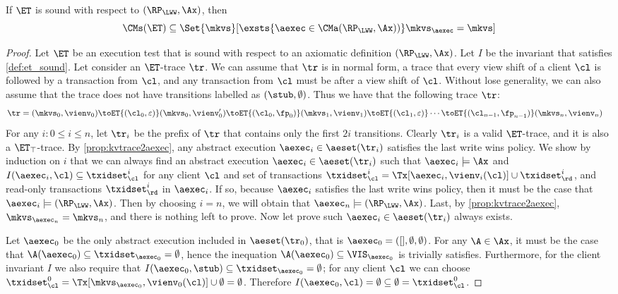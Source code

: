 \begin{theorem}[Soundness]
\label{thm:et_soundness}
If $\ET$ is sound with respect to $(\RP_{\LWW}, \Ax)$, then 
\[
    \CMs(\ET) \subseteq \Set{ \mkvs }[ \exsts{ \aexec \in \CMa(\RP_{\LWW}, \Ax)) }\mkvs_{\aexec} = \mkvs]
\]
\end{theorem}
\begin{proof}
Let $\ET$ be an execution test that is sound with respect to an 
axiomatic definition $(\RP_{\LWW}, \Ax)$. Let $I$ be 
the invariant that satisfies \cref{def:et_sound}. 
Let consider an $\ET$-trace $\tr$.
We can assume that $\tr$ is in normal form, 
a trace that every view shift of a client \( \cl \) is followed by a transaction from \( \cl \),
and any transaction from \( \cl \) must be after a view shift of \( \cl \).
Without lose generality, we can also assume that the trace does not have transitions labelled as $(\stub, \emptyset)$.
Thus we have that the following trace \( \tr \):
\begin{align*}
\tr & =  (\mkvs_{0}, \vienv_{0}) \toET{(\cl_{0}, \varepsilon)} (\mkvs_{0}, \vienv_{0}') 
\toET{(\cl_{0}, \fp_{0})} 
(\mkvs_1, \vienv_{1}) \toET{(\cl_1, \varepsilon)}  \cdots
\toET{(\cl_{n-1}, \fp_{n-1})} (\mkvs_{n}, \vienv_{n})
\end{align*}
For any $i : 0 \leq i \leq n$, let $\tr_{i}$ be the prefix of $\tr$ that 
contains only the first $2i$ transitions. 
Clearly $\tr_{i}$ is a valid $\ET$-trace, and it is also a $\ET_{\top}$-trace. 
By \cref{prop:kvtrace2aexec}, 
any abstract execution $\aexec_{i} \in \aeset(\tr_{i})$ satisfies the last write wins policy. 
We show by induction on $i$ that we can always find 
an abstract execution $\aexec_{i} \in \aeset(\tr_{i})$ such that $\aexec_i \models \Ax$ and $I(\aexec_{i}, \cl) \subseteq \txidset^{i}_{\cl}$
for any client $\cl$ and set of transactions 
$\txidset^{i}_{\cl} = \Tx[\aexec_{i}, \vienv_{i}(\cl)] \cup \txidset^{i}_\rd$, 
and read-only transactions $\txidset_\rd^{i}$ in $\aexec_{i}$.
If so, because $\aexec_{i}$ satisfies the last write wins policy,
then it must be the case that $\aexec_{i} \models (\RP_{\LWW}, \Ax)$. 
Then by choosing $i = n$, we will obtain that $\aexec_{n} \models (\RP_{\LWW}, \Ax)$. 
Last, by \cref{prop:kvtrace2aexec}, $\mkvs_{\aexec_{n}} = \mkvs_{n}$, and there is nothing left to prove.
Now let prove such $\aexec_{i} \in \aeset(\tr_{i})$ always exists.

Let $\aexec_{0}$ be the only abstract execution included in $\aeset(\tr_{0})$, 
that is $\aexec_{0} = ([], \emptyset, \emptyset)$. 
For any $\A \in \Ax$, it must be the case that 
$\A(\aexec_{0}) \subseteq \txidset_{\aexec_{0}} = \emptyset$, 
hence the inequation $\A(\aexec_{0}) \subseteq \VIS_{\aexec_{0}}$ is trivially satisfies.
Furthermore, for the client invariant $I$ we also require that $I(\aexec_{0}, \stub) \subseteq \txidset_{\aexec_{0}} = \emptyset$; 
for any client $\cl$ we can choose $\txidset_{\cl}^{0} = \Tx[\mkvs_{\aexec_{0}},\vienv_{0}(\cl)] \cup \emptyset = \emptyset$. 
Therefore $I(\aexec_{0}, \cl) = \emptyset \subseteq \emptyset = \txidset_{\cl}^{0}$.


\end{proof}
